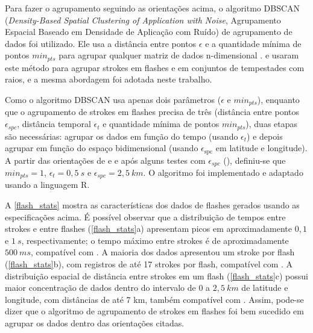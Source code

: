 Para fazer o agrupamento seguindo as orientações acima, o algoritmo DBSCAN (\textit{Density-Based Spatial Clustering of Application with Noise}, Agrupamento Espacial Baseado em Densidade de Aplicação com Ruído) de agrupamento de dados foi utilizado. Ele usa a distância entre pontos $\epsilon$ e a quantidade mínima de pontos $min_{pts}$ para agrupar qualquer matriz de dados n-dimensional \cite{Ester1996, Kriegel2011}.  e  usaram este método para agrupar strokes em flashes e em conjuntos de tempestades com raios, e a mesma abordagem foi adotada neste trabalho.

Como o algoritmo DBSCAN usa apenas dois parâmetros ($\epsilon$ e $min_{pts}$), enquanto que o agrupamento de strokes em flashes precisa de três (distância entre pontos $\epsilon_{spc}$, distância temporal $\epsilon_{t}$ e quantidade mínima de pontos $min_{pts}$), duas etapas são necessárias: agrupar os dados em função do tempo (usando $\epsilon_{t}$) e depois agrupar em função do espaço bidimensional (usando $\epsilon_{\text{spc}}$ em latitude e longitude). A partir das orientações de  e  e após alguns testes com $\epsilon_{spc}$ (), definiu-se que $min_{pts}=1$, $\epsilon_{t}=0,5\:s$ e $\epsilon_{spc}=2,5\:km$. O algoritmo foi implementado e adaptado usando a linguagem R.

A \autoref{flash_stats} mostra as características dos dados de flashes gerados usando as especificações acima. É possível observar que a distribuição de tempos entre strokes e entre flashes (\autoref{flash_stats}a) apresentam picos em aproximadamente $0,1$ e $1\:s$, respectivamente; o tempo máximo entre strokes é de aproximadamente $500\:ms$, compatível com . A maioria dos dados apresentou um stroke por flash (\autoref{flash_stats}b), com registros de até 17 strokes por flash, compatível com . A distribuição espacial de distância entre strokes em um flash (\autoref{flash_stats}c) possui maior concentração de dados dentro do intervalo de 0 a $2,5\:km$ de latitude e longitude, com distâncias de até 7 km, também compatível com . Assim, pode-se dizer que o algoritmo de agrupamento de strokes em flashes foi bem sucedido em agrupar os dados dentro das orientações citadas.

